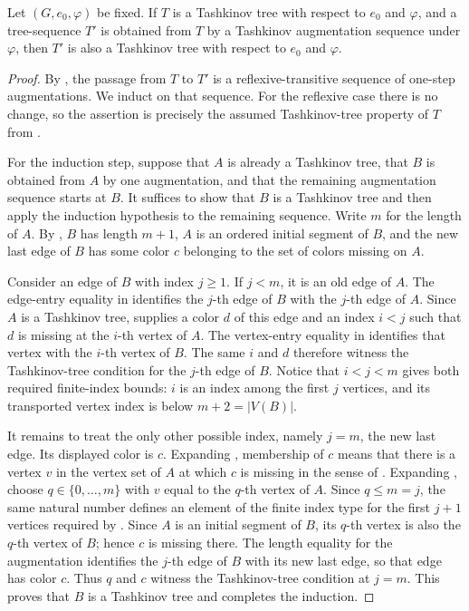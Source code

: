 \begin{lemma}
Let $(G,e_0,\varphi)$ be fixed.  If $T$ is a Tashkinov tree with respect
to $e_0$ and $\varphi$, and a tree-sequence $T'$ is obtained from $T$ by a
Tashkinov augmentation sequence under $\varphi$, then $T'$ is also a
Tashkinov tree with respect to $e_0$ and $\varphi$.
\end{lemma}
\begin{proof}
By , the passage from $T$ to $T'$
is a reflexive-transitive sequence of one-step augmentations.  We induct on
that sequence.  For the reflexive case there is no change, so the assertion
is precisely the assumed Tashkinov-tree property of $T$ from
.

For the induction step, suppose that $A$ is already a Tashkinov tree, that
$B$ is obtained from $A$ by one augmentation, and that the remaining
augmentation sequence starts at $B$.  It suffices to show that $B$ is a
Tashkinov tree and then apply the induction hypothesis to the remaining
sequence.  Write $m$ for the length of $A$.  By
, $B$ has length $m+1$, $A$ is an ordered
initial segment of $B$, and the new last edge of $B$ has some color $c$
belonging to the set of colors missing on $A$.

Consider an edge of $B$ with index $j\geq 1$.  If $j<m$, it is an old edge
of $A$.  The edge-entry equality in
 identifies the $j$-th edge of $B$
with the $j$-th edge of $A$.  Since $A$ is a Tashkinov tree,
 supplies a color $d$ of this edge and an index
$i<j$ such that $d$ is missing at the $i$-th vertex of $A$.  The
vertex-entry equality in  identifies
that vertex with the $i$-th vertex of $B$.  The same $i$ and $d$ therefore
witness the Tashkinov-tree condition for the $j$-th edge of $B$.  Notice
that $i<j<m$ gives both required finite-index bounds: $i$ is an index among
the first $j$ vertices, and its transported vertex index is below
$m+2=|V(B)|$.

It remains to treat the only other possible index, namely $j=m$, the new
last edge.  Its displayed color is $c$.  Expanding
, membership of $c$ means that there is a vertex
$v$ in the vertex set of $A$ at which $c$ is missing in the sense of
.  Expanding , choose
$q\in\{0,\ldots,m\}$ with $v$ equal to the $q$-th vertex of $A$.  Since
$q\leq m=j$, the same natural number defines an element of the finite index
type for the first $j+1$ vertices required by
.  Since $A$ is an initial segment of $B$, its
$q$-th vertex is also the $q$-th vertex of $B$; hence $c$ is missing there.
The length equality for the augmentation identifies the $j$-th edge of
$B$ with its new last edge, so that edge has color $c$.  Thus $q$ and $c$
witness the Tashkinov-tree condition at $j=m$.  This proves that $B$ is a
Tashkinov tree and completes the induction.
\end{proof}
